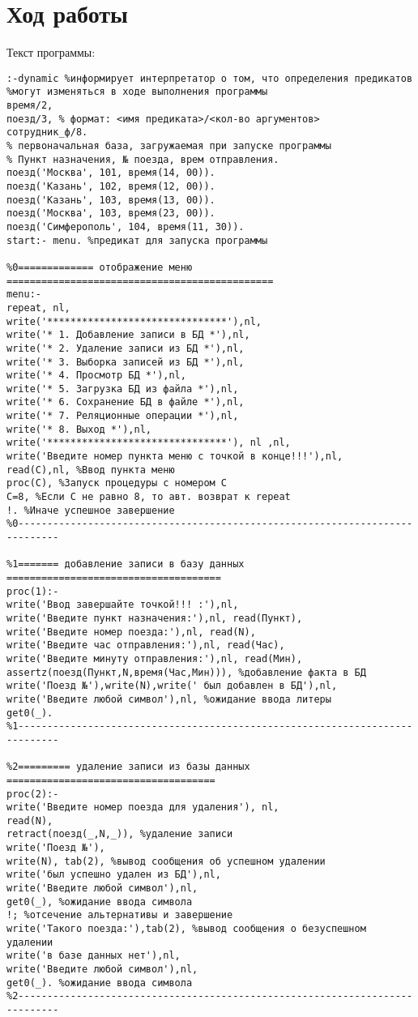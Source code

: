 \documentclass[a4paper,14pt]{extarticle}
\begin{document}
\section{Ход работы}
Текст программы:
\begin{lstlisting}
:-dynamic %информирует интерпретатор о том, что определения предикатов 
%могут изменяться в ходе выполнения программы 
время/2, 
поезд/3, % формат: <имя предиката>/<кол-во аргументов> 
сотрудник_ф/8. 
% первоначальная база, загружаемая при запуске программы 
% Пункт назначения, № поезда, врем отправления. 
поезд('Москва', 101, время(14, 00)). 
поезд('Казань', 102, время(12, 00)). 
поезд('Казань', 103, время(13, 00)). 
поезд('Москва', 103, время(23, 00)). 
поезд('Симферополь', 104, время(11, 30)). 
start:- menu. %предикат для запуска программы 
  
%0============= отображение меню ============================================== 
menu:- 
repeat, nl, 
write('*******************************'),nl, 
write('* 1. Добавление записи в БД *'),nl, 
write('* 2. Удаление записи из БД *'),nl, 
write('* 3. Выборка записей из БД *'),nl, 
write('* 4. Просмотр БД *'),nl, 
write('* 5. Загрузка БД из файла *'),nl, 
write('* 6. Сохранение БД в файле *'),nl, 
write('* 7. Реляционные операции *'),nl, 
write('* 8. Выход *'),nl, 
write('*******************************'), nl ,nl, 
write('Введите номер пункта меню с точкой в конце!!!'),nl, 
read(C),nl, %Ввод пункта меню 
proc(C), %Запуск процедуры с номером С 
C=8, %Если С не равно 8, то авт. возврат к repeat 
!. %Иначе успешное завершение 
%0----------------------------------------------------------------------------- 
  
%1======= добавление записи в базу данных ===================================== 
proc(1):- 
write('Ввод завершайте точкой!!! :'),nl, 
write('Введите пункт назначения:'),nl, read(Пункт), 
write('Введите номер поезда:'),nl, read(N), 
write('Введите час отправления:'),nl, read(Час), 
write('Введите минуту отправления:'),nl, read(Мин), 
assertz(поезд(Пункт,N,время(Час,Мин))), %добавление факта в БД 
write('Поезд №'),write(N),write(' был добавлен в БД'),nl, 
write('Введите любой символ'),nl, %ожидание ввода литеры 
get0(_). 
%1----------------------------------------------------------------------------- 
  
%2========= удаление записи из базы данных ==================================== 
proc(2):- 
write('Введите номер поезда для удаления'), nl, 
read(N), 
retract(поезд(_,N,_)), %удаление записи 
write('Поезд №'), 
write(N), tab(2), %вывод сообщения об успешном удалении 
write('был успешно удален из БД'),nl, 
write('Введите любой символ'),nl, 
get0(_), %ожидание ввода символа 
!; %отсечение альтернативы и завершение 
write('Такого поезда:'),tab(2), %вывод сообщения о безуспешном удалении 
write('в базе данных нет'),nl, 
write('Введите любой символ'),nl, 
get0(_). %ожидание ввода символа 
%2----------------------------------------------------------------------------- 
  

\end{lstlisting}
\end{document}

